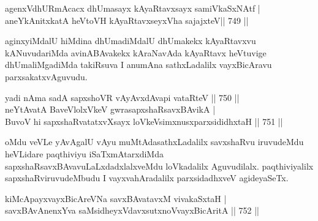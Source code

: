 
\begin{shl}
agenxV\footnotemark[1]dhURmAcacx dhUmasayx kAyaRtavxsayx samiVkaSxNAtf | \\
\footnotemark[2]aneYkAnitxkatA heVtoVH kAyaRtavxseyxVha sajajxteV\hfill ||  749 ||  
\end{shl}

\begin{artha}
aginxyiMdalU hiMdina dhUmadiMdalU dhUmakekx kAyaRtavxvu kANuvudariMda avinABAvakekx kAraNavAda kAyaRtavx heVtuvige dhUmaliMgadiMda takiRsuva I anumAna sathxLadalilx vayxBicAravu parxsakatxvAguvudu.
\end{artha}


\begin{shl}
yadi nAma sadA sapxshoVR vAyAvxdAvapi vataRteV \hfill||  750 ||  \\
neYtAvatA BaveVlolxVkeV gwrasapxshaRsavxBAvikA | \\
BuvoV hi sapxshaRvatatxvXsayx loVkeV\s simxnusxparxsididhxtaH \hfill||  751 ||  
\end{shl}

\begin{artha}
oMdu veVLe yAvAgalU vAyu muMtAdasathxLadalilx savxshaRvu iruvudeMdu heVLidare paqthiviyu iSaTxmAtarxdiMda sapxshaRsavxBAvavuLaLxdadxlalxveMdu loVkadalilx Aguvudilalx. paqthiviyalilx sapxshaRviruvudeMbudu I vayxvahAradalilx parxsidadhxveV agideyaSeTx.
\end{artha}

\begin{shl}
kiMcApayx\footnotemark[1]vayxBicAreVNa savxBAvatavxM vivakaSxtaH | \\
savxBAvAnenxYva saMsidheyxVdavxsutxnoV\s \footnotemark[2]vayxBicAritA \hfill||  752 ||  
\end{shl}

